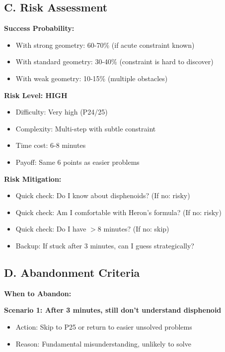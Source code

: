 \documentclass[12pt]{article}
\begin{document}
\begin{competitionbox}
\subsection*{C. Risk Assessment}

\textbf{Success Probability:}
\begin{itemize}
    \item With strong geometry: 60-70\% (if acute constraint known)
    \item With standard geometry: 30-40\% (constraint is hard to discover)
    \item With weak geometry: 10-15\% (multiple obstacles)
\end{itemize}

\textbf{Risk Level: HIGH}
\begin{itemize}
    \item Difficulty: Very high (P24/25)
    \item Complexity: Multi-step with subtle constraint
    \item Time cost: 6-8 minutes
    \item Payoff: Same 6 points as easier problems
\end{itemize}

\textbf{Risk Mitigation:}
\begin{itemize}
    \item Quick check: Do I know about disphenoids? (If no: risky)
    \item Quick check: Am I comfortable with Heron's formula? (If no: risky)
    \item Quick check: Do I have $>$8 minutes? (If no: skip)
    \item Backup: If stuck after 3 minutes, can I guess strategically?
\end{itemize}

\subsection*{D. Abandonment Criteria}

\textbf{When to Abandon:}

\textbf{Scenario 1: After 3 minutes, still don't understand disphenoid}
\begin{itemize}
    \item Action: Skip to P25 or return to easier unsolved problems
    \item Reason: Fundamental misunderstanding, unlikely to solve
\end{itemize}


\end{competitionbox}
\end{document}
